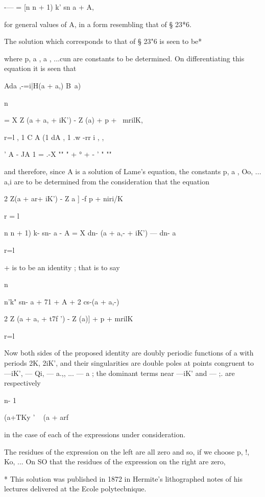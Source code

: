 {{{{{{{{-— = [n n + 1) k' sn a + A,

for general values of A, in a form resembling that of § 23*6.

The solution which corresponds to that of § 23"6 is seen to be*






where p, a , a , ...cun are constants to be determined. On
differentiating this equation it is seen that

Ada ,-=i|H(a + a,) B\ a)\ \

n

= X Z (a + a, + iK') - Z (a) + p + \ mrilK,

r=l , 1 C A (1 dA , 1 .w -rr i , ,

   ' A - JA 1 = .-X "" " + ° + - ' " ""

and therefore, since A is a solution of Lame's equation, the constants
p, a , Oo, ... a,i are to be determined from the consideration that
the equation



2 Z(a + ar+ iK') - Z a ] -f p + niri/K

r = l



n n + 1) k- sn- a - A = X dn- (a + a,- + iK') — dn- a

r=l

+ is to be an identity ; that is to say

n

n'k" sn- a + 71 + A + 2 cs-(a + a,-)

2 Z (a + a, + t7f ') - Z (a)] + p + mrilK



r=l



Now both sides of the proposed identity are doubly periodic functions
of a with periods 2K, 2iK', and their singularities are double poles
at points congruent to —iK', — Qi, — a.,, ... — a ; the dominant terms
near —iK' and — ;. are respectively

n- 1

(a+TKy ' ~ (a + arf

in the case of each of the expressions under consideration.

The residues of the expression on the left are all zero and so, if we
choose p, !, Ko, ... On SO that the residues of the expression on the
right are zero,

* This solution was published in 1872 in Hermite's lithographed notes
of his lectures delivered at the Ecole polytecbnique.



}}}}}}}}
